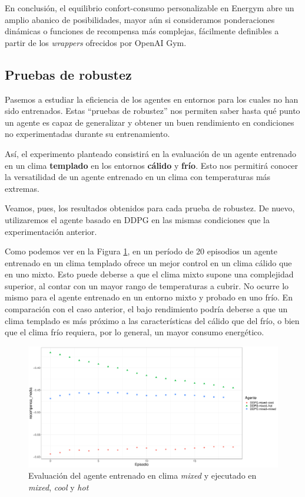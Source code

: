 En conclusión, el equilibrio confort-consumo personalizable en Energym abre un amplio abanico de posibilidades, mayor aún si consideramos ponderaciones dinámicas o funciones de recompensa más complejas, fácilmente definibles a partir de los \textit{wrappers} ofrecidos por OpenAI Gym.

\subsection{Pruebas de robustez}
\label{sec:robustez}

Pasemos a estudiar la eficiencia de los agentes en entornos para los cuales no han sido entrenados. Estas ``pruebas de robustez'' nos permiten saber hasta qué punto un agente es capaz de generalizar y obtener un buen rendimiento en condiciones no experimentadas durante su entrenamiento.

Así, el experimento planteado consistirá en la evaluación de un agente entrenado en un clima \textbf{templado} en los entornos \textbf{cálido} y \textbf{frío}. Esto nos permitirá conocer la versatilidad de un agente entrenado en un clima con temperaturas más extremas.

Veamos, pues, los resultados obtenidos para cada prueba de robustez. De nuevo, utilizaremos el agente basado en DDPG en las mismas condiciones que la experimentación anterior.

Como podemos ver en la Figura \ref{fig:recompensa-robustez}, en un período de 20 episodios un agente entrenado en un clima templado ofrece un mejor control en un clima cálido que en uno mixto. Esto puede deberse a que el clima mixto supone una complejidad superior, al contar con un mayor rango de temperaturas a cubrir. No ocurre lo mismo para el agente entrenado en un entorno mixto y probado en uno frío. En comparación con el caso anterior, el bajo rendimiento podría deberse a que un clima templado es más próximo a las características del cálido que del frío, o bien que el clima frío requiera, por lo general, un mayor consumo energético.

\begin{figure}
    \centering
    \includegraphics[width=\textwidth]{imagenes/recompensa-robustez.pdf}
    \caption{Evaluación del agente entrenado en clima \textit{mixed} y ejecutado en \textit{mixed}, \textit{cool} y \textit{hot}}
    \label{fig:recompensa-robustez}
\end{figure}

